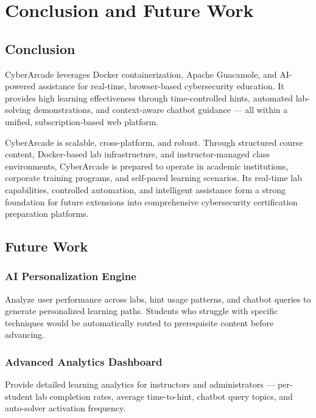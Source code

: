 \documentclass[12pt,a4paper]{report}
\begin{document}
\chapter[Conclusion and Future Work]{Conclusion and Future Work}

\section{Conclusion}

CyberArcade leverages Docker containerization, Apache Guacamole, and AI-powered assistance for
real-time, browser-based cybersecurity education. It provides high learning effectiveness through
time-controlled hints, automated lab-solving demonstrations, and context-aware chatbot guidance ---
all within a unified, subscription-based web platform.

CyberArcade is scalable, cross-platform, and robust. Through structured course content, Docker-based
lab infrastructure, and instructor-managed class environments, CyberArcade is prepared to operate in
academic institutions, corporate training programs, and self-paced learning scenarios. Its real-time
lab capabilities, controlled automation, and intelligent assistance form a strong foundation for future
extensions into comprehensive cybersecurity certification preparation platforms.

\section{Future Work}

\subsection{AI Personalization Engine}

Analyze user performance across labs, hint usage patterns, and chatbot queries to generate
personalized learning paths. Students who struggle with specific techniques would be automatically
routed to prerequisite content before advancing.

\subsection{Advanced Analytics Dashboard}

Provide detailed learning analytics for instructors and administrators --- per-student lab completion
rates, average time-to-hint, chatbot query topics, and auto-solver activation frequency.
\end{document}
